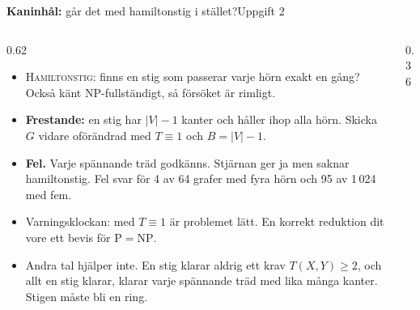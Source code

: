 \documentclass[aspectratio=169,10pt]{beamer}
\newcommand{\rabbit}{\textcolor{warnorange}{\textbf{Kaninhål:}} }
\newcommand{\prob}[1]{\textsc{#1}}
\begin{document}
\begin{frame}{\rabbit går det med hamiltonstig i stället?}{Uppgift 2}
  \begin{columns}[T]
    \begin{column}{0.62\textwidth}
      \begin{itemize}
        \item<1-> \prob{Hamiltonstig}: finns en stig som passerar varje hörn exakt en gång? Också känt NP-fullständigt, så försöket är rimligt.
        \item<2-> \textbf{Frestande:} en stig har $|V|-1$ kanter och håller ihop alla hörn. Skicka $G$ vidare oförändrad med $T\equiv1$ och $B=|V|-1$.
        \item<3-> \textbf{Fel.} Varje spännande träd godkänns. Stjärnan ger ja men saknar hamiltonstig. Fel svar för 4 av 64 grafer med fyra hörn och 95 av 1\,024 med fem.
        \item<4-> Varningsklockan: med $T\equiv1$ är problemet lätt. En korrekt reduktion dit vore ett bevis för $\mathrm{P}=\mathrm{NP}$.
        \item<5-> Andra tal hjälper inte. En stig klarar aldrig ett krav $T(X,Y)\ge2$, och allt en stig klarar, klarar varje spännande träd med lika många kanter. Stigen måste bli en ring.
      \end{itemize}
    \end{column}
    \begin{column}{0.36\textwidth}
      \centering
    \end{column}
  \end{columns}
\end{frame}
\end{document}
